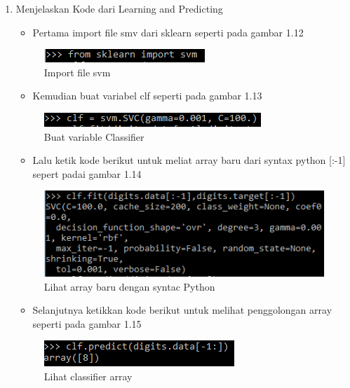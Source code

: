 \begin{enumerate}
\item Menjelaskan Kode dari Learning and Predicting
\begin{itemize}
\item Pertama import file smv dari sklearn seperti pada gambar 1.12
\end{itemize}
\begin{figure}[ht]
\centering
\includegraphics[scale=0.9]{figures/2_1.png}
\caption{Import file svm}
\label{Import svm}
\end{figure}
\begin{itemize}
\item Kemudian buat variabel clf seperti pada gambar 1.13
\end{itemize}
\begin{figure}[ht]
\centering
\includegraphics[scale=0.9]{figures/2_2.png}
\caption{Buat variable Classifier}
\label{Variabel clf}
\end{figure}
\begin{itemize}
\item Lalu ketik kode berikut untuk meliat array baru dari syntax python [:-1] sepert padai gambar 1.14
\end{itemize}
\begin{figure}[ht]
\centering
\includegraphics[scale=0.7]{figures/2_3.png}
\caption{Lihat array baru dengan syntac Python}
\label{Syntax python}
\end{figure}
\begin{itemize}
\item Selanjutnya ketikkan kode berikut untuk melihat penggolongan array seperti pada gambar 1.15
\end{itemize}
\begin{figure}[ht]
\centering
\includegraphics[scale=0.7]{figures/2_4.png}
\caption{Lihat classifier array}
\label{Classifier Array}
\end{figure}

\end{enumerate}


